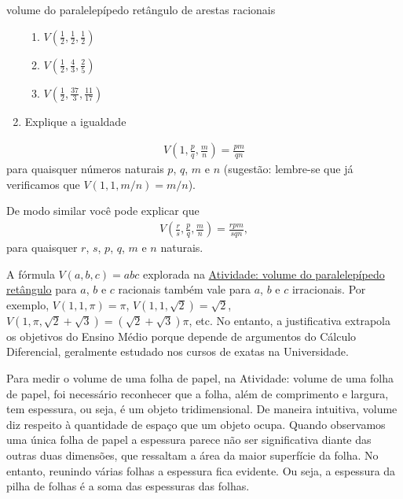 \begin{task}{volume do paralelepípedo retângulo de arestas racionais}
\begin{enumerate}
\begin{enumerate}
\item {} 
\(V\left(\frac{1}{2},\frac{1}{2},\frac{1}{2}\right)\)

\item {} 
\(V\left(\frac{1}{2},\frac{4}{3},\frac{2}{5}\right)\)

\item {} 
\(V\left(\frac{1}{2},\frac{37}{3},\frac{11}{17}\right)\)

\end{enumerate}

\item {} 
Explique a igualdade

\end{enumerate}
\begin{equation*}
\begin{split}V\left(1, \frac{p}{q}, \frac{m}{n}\right) = \frac{pm}{qn}\end{split}
\end{equation*}
para quaisquer números naturais \(p\), \(q\), \(m\) e \(n\) (sugestão: lembre-se que já verificamos que \(V(1, 1, m/n) = m/n\)).

De modo similar você pode explicar que
\begin{equation*}
\begin{split}\displaystyle{V\left(\frac{r}{s}, \frac{p}{q}, \frac{m}{n}\right) = \frac{rpm}{sqn}},\end{split}
\end{equation*}
para quaisquer \(r\), \(s\), \(p\), \(q\), \(m\) e \(n\) naturais.
\end{task}

\begin{observation}{}

A fórmula \(V(a,b,c) = abc\) explorada na \hyperref[persp1-atividade-3]{Atividade: volume do paralelepípedo retângulo} para \(a\), \(b\) e \(c\) racionais também vale para \(a\), \(b\) e \(c\) irracionais. Por exemplo, \(V(1,1,\pi) = \pi\), \(V(1,1,\sqrt{2}) = \sqrt{2}\), \(V(1,\pi,\sqrt{2} + \sqrt{3}) = (\sqrt{2} + \sqrt{3})\pi\), etc. No entanto, a justificativa extrapola os objetivos do Ensino Médio porque depende de argumentos do Cálculo Diferencial, geralmente estudado nos cursos de exatas na Universidade.
\end{observation}


\label{\detokenize{GE504-1:organizando-as-ideias-o-conceito-de-volume}}\label{\detokenize{GE504-1::doc}}
Para medir o volume de uma folha de papel, na Atividade: volume de uma folha de papel, foi necessário reconhecer que a folha, além de comprimento e largura, tem espessura, ou seja, é um objeto tridimensional.  De maneira intuitiva, volume diz respeito à quantidade de espaço que um objeto ocupa. Quando observamos uma única folha de papel a espessura parece não ser significativa diante das outras duas dimensões, que ressaltam a área da maior superfície da folha. No entanto, reunindo várias folhas a espessura fica evidente. Ou seja, a espessura da pilha de folhas é a soma das espessuras das folhas.


